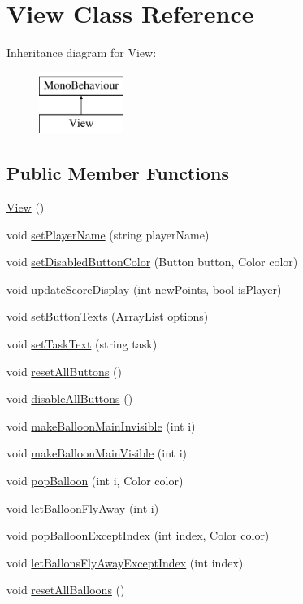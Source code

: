 \hypertarget{classView}{}\section{View Class Reference}
\label{classView}
Inheritance diagram for View\+:\begin{figure}[H]
\begin{center}
\leavevmode
\includegraphics[height=2.000000cm]{classView}
\end{center}
\end{figure}
\subsection*{Public Member Functions}
\begin{DoxyCompactItemize}
\item 
\hyperlink{classView_a218e935db0c3320275ff8a56637d2f47}{View} ()
\item 
void \hyperlink{classView_ade124fb0c6d19ad9c4ff64f58b37d13b}{set\+Player\+Name} (string player\+Name)
\item 
void \hyperlink{classView_a6d8bb240232381d2018d3b26393b51c0}{set\+Disabled\+Button\+Color} (Button button, Color color)
\item 
void \hyperlink{classView_a979f3676bda4ef9f79bcf5b601120c9a}{update\+Score\+Display} (int new\+Points, bool is\+Player)
\item 
void \hyperlink{classView_aa0b0a3a9e4ae68745de1870b4f85433e}{set\+Button\+Texts} (Array\+List options)
\item 
void \hyperlink{classView_a6fd402a60f74017d20a321e05d8bc787}{set\+Task\+Text} (string task)
\item 
void \hyperlink{classView_a8586560027cd5d93aaf70d494c0189b4}{reset\+All\+Buttons} ()
\item 
void \hyperlink{classView_a89b76b661b1bb6511d4b86ff3cf6a0b0}{disable\+All\+Buttons} ()
\item 
void \hyperlink{classView_a9707ef8cbbb82f46263230d2623716eb}{make\+Balloon\+Main\+Invisible} (int i)
\item 
void \hyperlink{classView_a34ea9f566a24a298d6848c497438ca9d}{make\+Balloon\+Main\+Visible} (int i)
\item 
void \hyperlink{classView_a7b8dc6ece898af6cce44d1b48e1d1ccd}{pop\+Balloon} (int i, Color color)
\item 
void \hyperlink{classView_a827b596956e88fd616050dcdd0dee6d2}{let\+Balloon\+Fly\+Away} (int i)
\item 
void \hyperlink{classView_a1ce5325961058c28aeb0d31cf8e8dfa1}{pop\+Balloon\+Except\+Index} (int index, Color color)
\item 
void \hyperlink{classView_a311fc84582f2dcb23dfbc77dcf5f82e3}{let\+Ballons\+Fly\+Away\+Except\+Index} (int index)
\item 
void \hyperlink{classView_a00bad032ce14da298bf9ab08fe13fd35}{reset\+All\+Balloons} ()
\end{DoxyCompactItemize}
